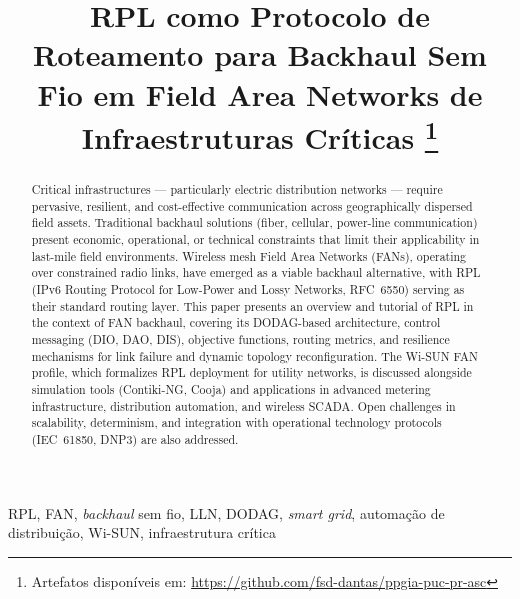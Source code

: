 \documentclass[conference]{IEEEtran}
\begin{document}
\title{RPL como Protocolo de Roteamento para Backhaul Sem Fio em
Field Area Networks de Infraestruturas Críticas%
\thanks{Artefatos disponíveis em:
\url{https://github.com/fsd-dantas/ppgia-puc-pr-asc}}}

\author{
}

\maketitle

\begin{abstract}
Critical infrastructures --- particularly electric distribution networks
--- require pervasive, resilient, and cost-effective communication across
geographically dispersed field assets. Traditional backhaul solutions (fiber,
cellular, power-line communication) present economic, operational, or technical
constraints that limit their applicability in last-mile field environments.
Wireless mesh Field Area Networks (FANs), operating over constrained radio
links, have emerged as a viable backhaul alternative, with RPL (IPv6 Routing
Protocol for Low-Power and Lossy Networks, RFC~6550) serving as their standard
routing layer. This paper presents an overview and tutorial of RPL in the
context of FAN backhaul, covering its DODAG-based architecture, control
messaging (DIO, DAO, DIS), objective functions, routing metrics, and resilience
mechanisms for link failure and dynamic topology reconfiguration. The Wi-SUN
FAN profile, which formalizes RPL deployment for utility networks, is discussed
alongside simulation tools (Contiki-NG, Cooja) and applications in advanced
metering infrastructure, distribution automation, and wireless SCADA. Open
challenges in scalability, determinism, and integration with operational
technology protocols (IEC~61850, DNP3) are also addressed.
\end{abstract}

\begin{IEEEkeywords}
RPL, FAN, \textit{backhaul} sem fio, LLN, DODAG, \textit{smart grid}, automação de distribuição,
Wi-SUN, infraestrutura crítica
\end{IEEEkeywords}
\end{document}
